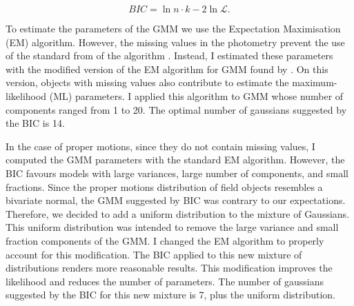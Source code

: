 \begin{equation}
\label{eq:BIC}
BIC = \ln{n}\cdot k - 2 \ln{\mathcal{L}}.
\end{equation}

To estimate the parameters of the GMM we use the Expectation Maximisation (EM) algorithm. However, the missing values in the photometry prevent the use of the standard from of the algorithm \cite[see for example Chapter 9 of][]{Bishop2006}.
Instead, I estimated these parameters with the modified version of the EM algorithm for GMM found by \citet{McMichael1996}. On this version, objects with missing values also contribute to estimate the maximum-likelihood (ML) parameters. I applied this algorithm to GMM whose number of components ranged from 1 to 20. The optimal number of gaussians suggested by the BIC is 14. 

In the case of proper motions, since they do not contain missing values, I computed the GMM parameters with the standard EM algorithm. However, the BIC favours models with large variances,  large number of components, and small fractions. Since the proper motions distribution of field objects resembles a bivariate normal, the GMM suggested by BIC was contrary to our expectations. Therefore, we decided to add a uniform distribution to the mixture of Gaussians. This uniform distribution was intended to remove the large variance and small fraction components of the GMM. I changed the EM algorithm to properly account for this modification. The BIC applied to this new mixture of distributions renders more reasonable results. This modification improves the likelihood and reduces the number of parameters. The number of gaussians suggested by the BIC for this new mixture is 7, plus the uniform distribution. 

